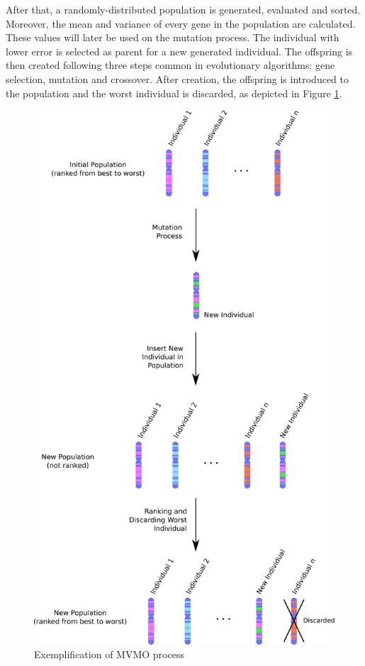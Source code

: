 After that, a randomly-distributed population is generated, evaluated and sorted. Moreover, the mean and variance of every gene in the population are calculated. These values will later be used on the mutation process. The individual with lower error is selected as parent for a new generated individual. The offspring is then created following three steps common in evolutionary algorithms: gene selection, mutation and crossover. After creation, the offspring is introduced to the population and the worst individual is discarded, as depicted in Figure \ref{fig: MVMOprocess}.

\begin{figure}[h]
	\caption{Exemplification of MVMO process}
	\begin{center}
		\includegraphics[scale=.2]{Images/MVMO_process2.eps}
	\end{center}
	\label{fig: MVMOprocess}
\end{figure}

